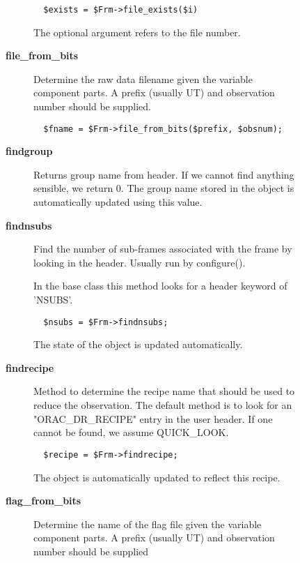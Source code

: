\begin{description}
\begin{description}
\begin{description}
\begin{verbatim}
  $exists = $Frm->file_exists($i)
\end{verbatim}


The optional argument refers to the file number.


\item[{\textbf{file\_from\_bits}}] \mbox{}

Determine the raw data filename given the variable component
parts. A prefix (usually UT) and observation number should
be supplied.

\begin{verbatim}
  $fname = $Frm->file_from_bits($prefix, $obsnum);
\end{verbatim}

\item[{\textbf{findgroup}}] \mbox{}

Returns group name from header.  If we cannot find anything sensible,
we return 0.  The group name stored in the object is automatically
updated using this value.


\item[{\textbf{findnsubs}}] \mbox{}

Find the number of sub-frames associated with the frame by looking in
the header. Usually run by configure().



In the base class this method looks for a header keyword of 'NSUBS'.

\begin{verbatim}
  $nsubs = $Frm->findnsubs;
\end{verbatim}


The state of the object is updated automatically.


\item[{\textbf{findrecipe}}] \mbox{}

Method to determine the recipe name that should be used to reduce the
observation.  The default method is to look for an "ORAC\_DR\_RECIPE" entry
in the user header. If one cannot be found, we assume QUICK\_LOOK.

\begin{verbatim}
  $recipe = $Frm->findrecipe;
\end{verbatim}


The object is automatically updated to reflect this recipe.


\item[{\textbf{flag\_from\_bits}}] \mbox{}

Determine the name of the flag file given the variable
component parts. A prefix (usually UT) and observation number
should be supplied


\end{description}
\end{description}
\end{description}
